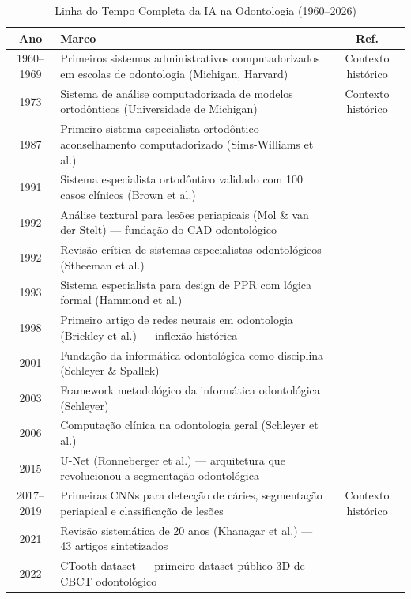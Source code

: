 \begin{table}[H]
  \centering
  \caption{Linha do Tempo Completa da IA na Odontologia (1960--2026)}
  \label{tab:linha-tempo-ia}
  \small
  \begin{tabularx}{\textwidth}{cXc}
    \toprule
    \textbf{Ano} & \textbf{Marco} & \textbf{Ref.} \\
    \midrule
    1960--1969 & Primeiros sistemas administrativos computadorizados em escolas de odontologia (Michigan, Harvard) & Contexto histórico \\
    1973 & Sistema de análise computadorizada de modelos ortodônticos (Universidade de Michigan) & Contexto histórico \\
    1987 & Primeiro sistema especialista ortodôntico — aconselhamento computadorizado (Sims-Williams et al.) & \cite{ODT-052} \\
    1991 & Sistema especialista ortodôntico validado com 100 casos clínicos (Brown et al.) & \cite{ODT-051} \\
    1992 & Análise textural para lesões periapicais (Mol \& van der Stelt) — fundação do CAD odontológico & \cite{ODT-043, ODT-064} \\
    1992 & Revisão crítica de sistemas especialistas odontológicos (Stheeman et al.) & \cite{ODT-008} \\
    1993 & Sistema especialista para design de PPR com lógica formal (Hammond et al.) & \cite{ODT-003} \\
    1998 & Primeiro artigo de redes neurais em odontologia (Brickley et al.) — inflexão histórica & \cite{ODT-002} \\
    2001 & Fundação da informática odontológica como disciplina (Schleyer \& Spallek) & \cite{ODT-007} \\
    2003 & Framework metodológico da informática odontológica (Schleyer) & \cite{ODT-004} \\
    2006 & Computação clínica na odontologia geral (Schleyer et al.) & \cite{ODT-006} \\
    2015 & U-Net (Ronneberger et al.) — arquitetura que revolucionou a segmentação odontológica & \cite{ronneberger2015u} \\
    2017--2019 & Primeiras CNNs para detecção de cáries, segmentação periapical e classificação de lesões & Contexto histórico \\
    2021 & Revisão sistemática de 20 anos (Khanagar et al.) — 43 artigos sintetizados & \cite{ODT-001} \\
    2022 & CTooth dataset — primeiro dataset público 3D de CBCT odontológico & \cite{ODT-030, ODT-031} \\

\end{tabularx}
\end{table}
